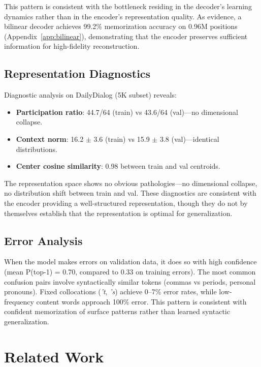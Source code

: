 \documentclass[11pt]{article}
\begin{document}
This pattern is consistent with the bottleneck residing in the decoder's learning dynamics rather than in the encoder's representation quality. As evidence, a bilinear decoder achieves 99.2\% memorization accuracy on 0.96M positions (Appendix~\ref{app:bilinear}), demonstrating that the encoder preserves sufficient information for high-fidelity reconstruction.

\subsection{Representation Diagnostics}

Diagnostic analysis on DailyDialog (5K subset) reveals:
\begin{itemize}[leftmargin=1.5em]
    \item \textbf{Participation ratio}: 44.7/64 (train) vs 43.6/64 (val)---no dimensional collapse.
    \item \textbf{Context norm}: 16.2 $\pm$ 3.6 (train) vs 15.9 $\pm$ 3.8 (val)---identical distributions.
    \item \textbf{Center cosine similarity}: 0.98 between train and val centroids.
\end{itemize}
The representation space shows no obvious pathologies---no dimensional collapse, no distribution shift between train and val. These diagnostics are consistent with the encoder providing a well-structured representation, though they do not by themselves establish that the representation is optimal for generalization.

\subsection{Error Analysis}

When the model makes errors on validation data, it does so with high confidence (mean P(top-1) = 0.70, compared to 0.33 on training errors). The most common confusion pairs involve syntactically similar tokens (commas vs periods, personal pronouns). Fixed collocations (\emph{'t}, \emph{'s}) achieve 0--7\% error rates, while low-frequency content words approach 100\% error. This pattern is consistent with confident memorization of surface patterns rather than learned syntactic generalization.

\section{Related Work}
\label{sec:related}
\end{document}
